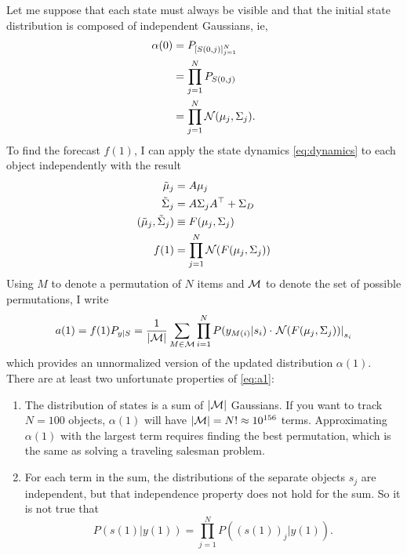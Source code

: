 \documentclass[12pt]{article}
\newcommand{\normal}[2]{{\cal N}(#1,#2)}
\newcommand{\M}{{\cal M}}
\newcommand{\transpose}{^\top}
\newcommand{\ti}[2]{{#1}{(#2)}}                         %
\newcommand{\ts}[4]{{\left[ #1(#2) \right]}_{#3}^{#4}} %
\begin{document}
Let me suppose that each state must always be visible and that the
initial state distribution is composed of independent Gaussians, ie,
\begin{align*}
  \ti{\alpha}{0} &= P_{\ts{S}{0,j}{j=1}{N} }\\
  &= \prod_{j=1}^{N} P_{\ti{S}{0,j}} \\
  &= \prod_{j=1}^{N} \normal{\mu_j}{\Sigma_j}.
\end{align*}
To find the forecast $\ti{f}{1}$, I can apply the state dynamics
\eqref{eq:dynamics} to each object independently with the result
\begin{align*}
  \tilde \mu_j &= A \mu_j \\
  \tilde \Sigma_j &= A \Sigma_j A\transpose + \Sigma_D \\
  (\tilde \mu_j, \tilde \Sigma_j ) &\equiv F(\mu_j,\Sigma_j) \\
  \ti{f}{1} &= \prod_{j=1}^{N} {\cal N}(F(\mu_j,\Sigma_j))
\end{align*}
Using $M$ to denote a permutation of $N$ items and $\M$ to denote the
set of possible permutations, I write
\begin{equation}
  \label{eq:a1}
  a(1) = f(1) P_{y|S} = \frac{1}{\left| \M \right|} \sum_{M \in \M}
  \prod_{i=1}^N P(y_{M(i)}|s_i) \cdot \left. {\cal N}(F(\mu_j,\Sigma_j))\right|_{s_i}
\end{equation}
which provides an unnormalized version of the updated distribution
$\alpha(1)$.  There are at least two unfortunate properties of
\eqref{eq:a1}:
\begin{enumerate}
\item The distribution of states is a sum of $\left| \M \right|$
  Gaussians.  If you want to track $N=100$ objects, $\alpha(1)$ will
  have $\left| \M \right| = N! \approx 10^{156}$ terms.  Approximating
  $\alpha(1)$ with the largest term requires finding the best
  permutation, which is the same as solving a traveling salesman
  problem.
\item For each term in the sum, the distributions of the separate
  objects $s_j$ are independent, but that independence property does
  not hold for the sum.  So it is not true that
  \begin{equation*}
    P(s(1)|y(1)) = \prod_{j=1}^N  P\left( \left( s(1) \right)_j|y(1)
    \right).
  \end{equation*}
\end{enumerate}
\end{document}
